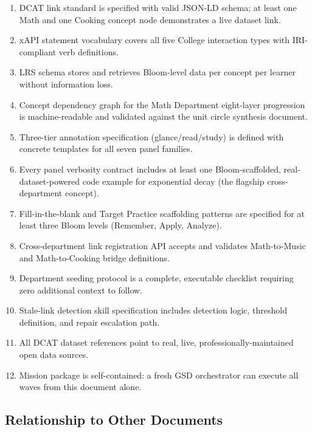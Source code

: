 \documentclass[11pt,letterpaper]{article}
\begin{document}
\begin{enumerate}
  \item DCAT link standard is specified with valid JSON-LD schema; at least one Math and one Cooking concept node demonstrates a live dataset link.
  \item xAPI statement vocabulary covers all five College interaction types with IRI-compliant verb definitions.
  \item LRS schema stores and retrieves Bloom-level data per concept per learner without information loss.
  \item Concept dependency graph for the Math Department eight-layer progression is machine-readable and validated against the unit circle synthesis document.
  \item Three-tier annotation specification (glance/read/study) is defined with concrete templates for all seven panel families.
  \item Every panel verbosity contract includes at least one Bloom-scaffolded, real-dataset-powered code example for exponential decay (the flagship cross-department concept).
  \item Fill-in-the-blank and Target Practice scaffolding patterns are specified for at least three Bloom levels (Remember, Apply, Analyze).
  \item Cross-department link registration API accepts and validates Math-to-Music and Math-to-Cooking bridge definitions.
  \item Department seeding protocol is a complete, executable checklist requiring zero additional context to follow.
  \item Stale-link detection skill specification includes detection logic, threshold definition, and repair escalation path.
  \item All DCAT dataset references point to real, live, professionally-maintained open data sources.
  \item Mission package is self-contained: a fresh GSD orchestrator can execute all waves from this document alone.
\end{enumerate}

\subsection{Relationship to Other Documents}
\end{document}
